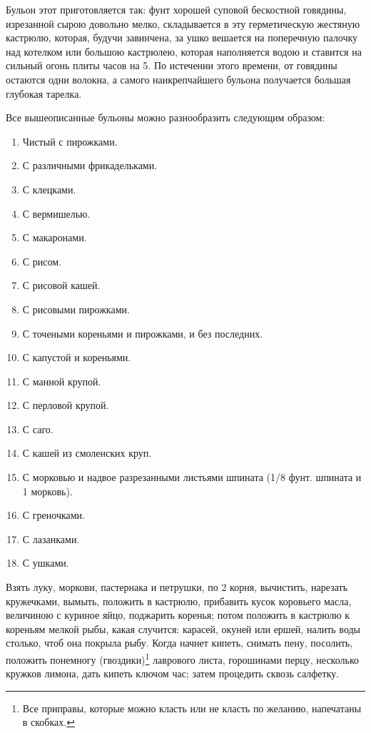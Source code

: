 Бульон этот приготовляется так: фунт хорошей суповой бескостной говядины, изрезанной сырою довольно мелко, складывается в эту герметическую жестяную кастрюлю, которая, будучи завинчена, за ушко вешается на поперечную палочку над котелком или большою кастрюлею, которая наполняется водою и ставится на сильный огонь плиты часов на 5. По истечении этого времени, от говядины остаются одни волокна, а самого наикрепчайшего бульона получается большая глубокая тарелка.


Все вышеописанные бульоны можно разнообразить следующим образом:
\begin{enumerate}
	\item Чистый с пирожками.
	\item С различными фрикадельками.
	\item С клецками.
	\item С вермишелью.
	\item С макаронами.
	\item С рисом.
	\item С рисовой кашей.
	\item С рисовыми пирожками.
	\item С точеными кореньями и пирожками, и без последних.
	\item С капустой и кореньями.
	\item С манной крупой.
	\item С перловой крупой.
	\item С саго.
	\item С кашей из смоленских круп.
	\item С морковью и надвое разрезанными листьями шпината (1/8 фунт. шпината и 1 морковь).
	\item С греночками.
	\item С лазанками.
	\item С ушками.
\end{enumerate}
 

Взять луку, моркови, пастернака и петрушки, по 2 корня, вычистить, нарезать кружечками, вымыть, положить в кастрюлю, прибавить кусок коровьего масла, величиною с куриное яйцо, поджарить коренья; потом положить в кастрюлю к кореньям мелкой рыбы, какая случится: карасей, окуней или ершей, налить воды столько, чтоб она покрыла рыбу. Когда начнет кипеть, снимать пену, посолить, положить понемногу (гвоздики)\footnote{Все приправы, которые можно класть или не класть по желанию, напечатаны в скобках.} лаврового листа, горошинами перцу, несколько кружков лимона, дать кипеть ключом час; затем процедить сквозь салфетку.

